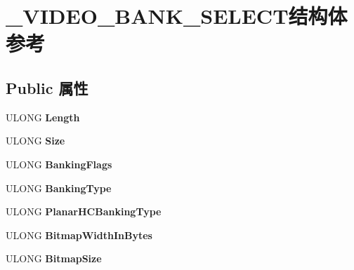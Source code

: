 \hypertarget{struct___v_i_d_e_o___b_a_n_k___s_e_l_e_c_t}{}\section{\+\_\+\+V\+I\+D\+E\+O\+\_\+\+B\+A\+N\+K\+\_\+\+S\+E\+L\+E\+C\+T结构体 参考}
\label{struct___v_i_d_e_o___b_a_n_k___s_e_l_e_c_t}
\subsection*{Public 属性}
\begin{DoxyCompactItemize}
\item 
\mbox{\label{struct___v_i_d_e_o___b_a_n_k___s_e_l_e_c_t_a880a3d749727fe90e857025b55011d80}} 
U\+L\+O\+NG {\bfseries Length}
\item 
\mbox{\label{struct___v_i_d_e_o___b_a_n_k___s_e_l_e_c_t_abee7c1c12c66076415dca0736497adef}} 
U\+L\+O\+NG {\bfseries Size}
\item 
\mbox{\label{struct___v_i_d_e_o___b_a_n_k___s_e_l_e_c_t_ae964d207a634a4d449613c813ce84ce3}} 
U\+L\+O\+NG {\bfseries Banking\+Flags}
\item 
\mbox{\label{struct___v_i_d_e_o___b_a_n_k___s_e_l_e_c_t_aab181b966ed960a6cf0ce6dfbef04ad4}} 
U\+L\+O\+NG {\bfseries Banking\+Type}
\item 
\mbox{\label{struct___v_i_d_e_o___b_a_n_k___s_e_l_e_c_t_a7e83531d7a9ff6cd14ac6d37af892c31}} 
U\+L\+O\+NG {\bfseries Planar\+H\+C\+Banking\+Type}
\item 
\mbox{\label{struct___v_i_d_e_o___b_a_n_k___s_e_l_e_c_t_a58b750129500cf7ac8e971a676afb959}} 
U\+L\+O\+NG {\bfseries Bitmap\+Width\+In\+Bytes}
\item 
\mbox{\label{struct___v_i_d_e_o___b_a_n_k___s_e_l_e_c_t_a08c63ffac78e4b788cdd39d75a46542d}} 
U\+L\+O\+NG {\bfseries Bitmap\+Size}

\end{DoxyCompactItemize}
